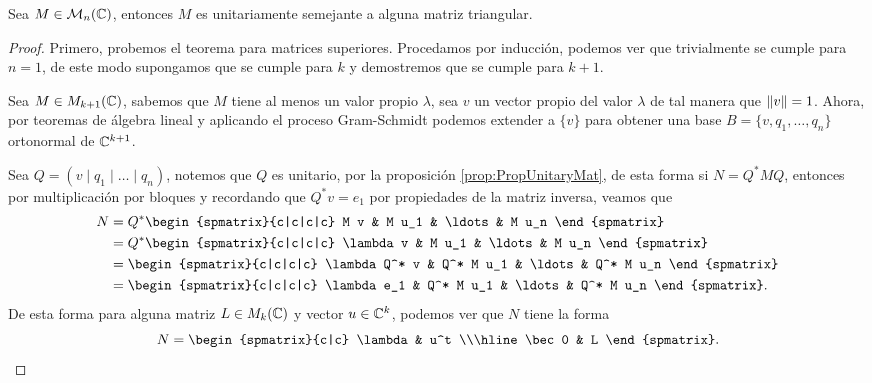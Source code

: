 \begin{teor}
  Sea $M \in\mathcal{M}_n(\mathbb{C})$, entonces $M$ es unitariamente semejante a alguna matriz triangular.
\end{teor}
\begin{proof}
  Primero, probemos el teorema para matrices superiores. Procedamos por inducción, podemos ver que trivialmente se cumple para $n = 1$, de este modo supongamos que se cumple para $k$ y demostremos que se cumple para $k+1$.
  
  Sea $M \in M_{k+1}(\mathbb{C})$, sabemos que $M$ tiene al menos un valor propio $\lambda$, sea $v$ un vector propio del valor $\lambda$ de tal manera que $\mathopen\|v\mathclose\|=1$. Ahora, por teoremas de álgebra lineal y aplicando el proceso Gram-Schmidt podemos extender a $\{v\}$ para obtener una base $B = \{ v, q_1, \ldots, q_n \}$ ortonormal de $\mathbb{C}^{k+1}$.
  
  Sea $Q = ( v \mid  q_1 \mid \ldots \mid q_n  ) $, notemos que $Q$ es unitario, por la proposición \ref{prop:PropUnitaryMat}, de esta forma si $N = Q^* M Q$, entonces por multiplicación por bloques y recordando que $Q^*v = e_1$ por propiedades de la matriz inversa, veamos que
  \begin{align*}
      N &= Q^* \begin{spmatrix}{c|c|c|c} M v &  M u_1 & \ldots & M u_n  \end{spmatrix} \\
        &= Q^* \begin{spmatrix}{c|c|c|c} \lambda v &  M u_1 & \ldots & M u_n  \end{spmatrix} \\
        &= \begin{spmatrix}{c|c|c|c} \lambda Q^* v  &  Q^* M u_1 & \ldots & Q^* M u_n  \end{spmatrix} \\
        &= \begin{spmatrix}{c|c|c|c} \lambda e_1 &  Q^* M u_1 & \ldots & Q^* M u_n  \end{spmatrix}.
  \end{align*}
  De esta forma para alguna matriz $L \in M_k(\mathbb{C})$ y vector $u \in \mathbb{C}^k$, podemos ver que $N$ tiene la forma
  \[
  N = \begin{spmatrix}{c|c} \lambda & u^t \\\hline \bec 0 & L \end{spmatrix}.
  \]
  

\end{proof}

